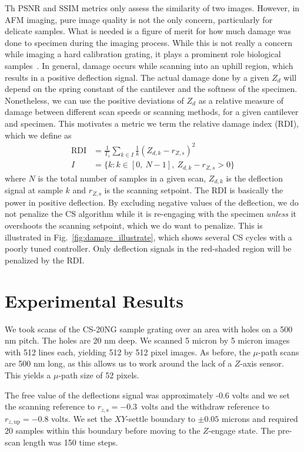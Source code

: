 \documentclass[twocolumn,oneside]{IEEEtran/IEEEtran}
\newcommand{\rzup}{\ensuremath{r_{z,\textrm{up}}}\xspace}
\newcommand{\rzs}{\ensuremath{r_{z,\textrm{s}}}\xspace}
\begin{document}
Th PSNR and SSIM metrics only assess the similarity of two images.
However, in AFM imaging, pure image quality is not the
only concern, particularly for delicate samples. What is needed is a figure of
merit for how much damage was done to specimen during the imaging process. While
this is not really a concern while imaging a hard calibration grating, it plays
a prominent role biological samples~\cite{ando_highspeed_2008}. In general,
damage occurs while scanning into an uphill region, which results in a positive
deflection signal. The actual damage done by a given $Z_d$ will depend on the
spring constant of the cantilever and the softness of the specimen. Nonetheless,
we can use the positive deviations of $Z_d$ as a relative measure of damage
between different scan speeds or scanning methods, for a given cantilever and
specimen. This motivates a metric we term the relative damage index (RDI), which
we define as
\begin{align}
  \text{RDI} &= \frac{1}{T_s}\sum_{k\in I} \frac{1}{k} \left(Z_{d,k} - r_{Z,s}\right)^2 \label{eqn:RDI}\\
  I &= \{k: k\in[0,~N-1],~ Z_{d,k}-r_{Z,s} > 0 \} \nonumber
\end{align}
where $N$ is the total number of samples in a given scan, $Z_{d,k}$ is the
deflection signal at sample $k$ and $r_{Z,\textrm{s}}$ is the scanning setpoint.
The RDI is basically the power in positive deflection. By excluding negative
values of the deflection, we do not penalize the CS algorithm while it is
re-engaging with the specimen \emph{unless} it overshoots the scanning setpoint,
which we do want to penalize. This is illustrated in
Fig.~\ref{fig:damage_illustrate}, which shows several CS cycles with a poorly
tuned controller. Only deflection signals in the red-shaded region will be
penalized by the RDI.

\section{Experimental Results}\label{sec:results}
We took scans of the CS-20NG sample grating over an area with holes on a 500 nm
pitch. The holes are 20 nm deep.
We scanned 5 micron by 5 micron images with 512
lines each, yielding 512 by 512 pixel images. As before, the $\mu$-path scans
are 500 nm long, as this allows us to work around the lack of a $Z$-axis sensor.
This yields a $\mu$-path size of 52 pixels.

The free value of the deflections signal was approximately -0.6 volts and we set
the scanning reference to ${\rzs=-0.3}$~volts and the withdraw reference to
${\rzup=-0.8}$ volts. We set the $XY$-settle boundary to $\pm 0.05$
microns and required 20 samples within this boundary before moving to the
$Z$-engage state. The pre-scan length was 150 time steps.
\end{document}
